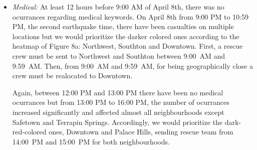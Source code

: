 \begin{itemize}                                                                  
     \item \emph{Medical:} At least 12 hours before 9:00 AM of April 8th, there was no ocurrances regarding
medical keywords. On April 8th from 9:00 PM to 10:59 PM, the second earthquake
time, there have been casualties on multiple locations
but we would prioritize the darker colored ones according to the heatmap of Figure 8a:
Northwest, Southton and Downtown. First, a rescue crew must be sent to Northwest
and Southton between     
     9:00~AM and 9:59~AM. Then, from 9:00~AM and 9:59~AM, for being geographically close a crew must be realocated to
Downtown. 

Again, between 12:00 PM and 13:00 PM there have been no medical ocurrances but from 13:00 PM
to 16:00 PM, the number of ocurrances increased significantly and affected
almost all neighbourhoods except Safetown and Terrapin Springs. Accordingly, we
would prioritize the dark-red-colored ones, Downtown and Palace Hills, sending
rescue team from 14:00~PM and 15:00~PM for both neighbourhoods.  


\end{itemize}
